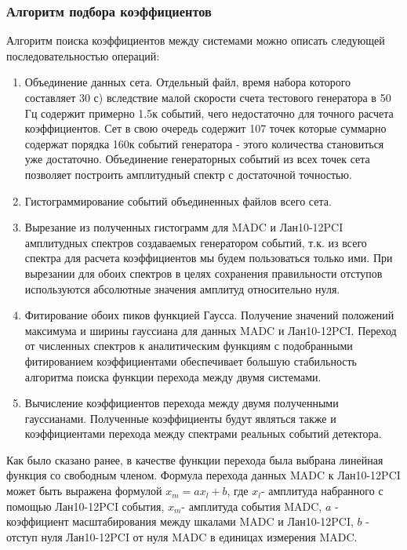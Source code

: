 \documentclass[a4paper,14pt]{extreport}
\begin{document}
\subsubsection{Алгоритм подбора коэффициентов}

Алгоритм поиска коэффициентов между системами можно описать следующей последовательностью операций:
\begin{enumerate}
    \item Объединение данных сета. Отдельный файл, время набора которого составляет 30 с) вследствие малой скорости счета тестового генератора в 50 Гц содержит примерно 1.5к событий, чего недостаточно для точного расчета коэффициентов. Сет в свою очередь содержит 107 точек которые суммарно содержат порядка 160к событий генератора - этого количества становиться уже достаточно. Объединение генераторных событий из всех точек сета позволяет построить амплитудный спектр с достаточной точностью.
    \item Гистограммирование событий объединенных файлов всего сета. 
    \item Вырезание из полученных гистограмм для MADC и Лан10-12PCI амплитудных спектров создаваемых генератором событий, т.к. из всего спектра для расчета коэффициентов мы будем пользоваться только ими. При вырезании для обоих спектров в целях сохранения правильности отступов используются абсолютные значения амплитуд относительно нуля.
    \item Фитирование обоих пиков функцией Гаусса. Получение значений положений максимума и ширины гауссиана для данных MADC и Лан10-12PCI. Переход от численных спектров к аналитическим функциям с подобранными фитированием коэффициентами обеспечивает большую стабильность алгоритма поиска функции перехода между двумя системами.
    \item Вычисление коэффициентов перехода между двумя полученными гауссианами. Полученные коэффициенты будут являться также и коэффициентами перехода между спектрами реальных событий детектора.
\end{enumerate}

Как было сказано ранее, в качестве функции перехода была выбрана линейная функция со свободным членом. Формула перехода данных MADC к Лан10-12PCI может быть выражена формулой $ x_m= a x_l + b $, где $ x_l $- амплитуда набранного с помощью  Лан10-12PCI события, $ x_m $- амплитуда события MADC, $ a $ - коэффициент масштабирования между шкалами MADC и Лан10-12PCI, $ b $ - отступ нуля Лан10-12PCI от нуля MADC в единицах измерения MADC.
\end{document}
